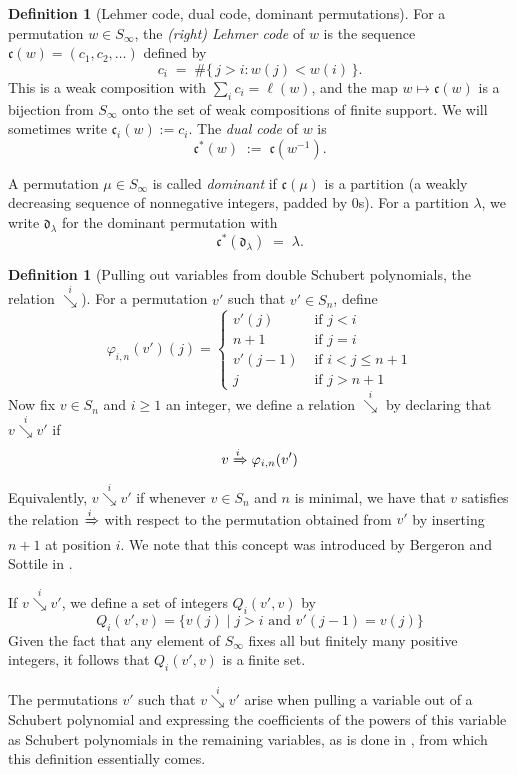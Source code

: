 \documentclass{amsart}
\theoremstyle{definition}
\newtheorem{definition}[lemma]{Definition}
\theoremstyle{remark}
\numberwithin{equation}{subsection}
\newcommand{\downvar}[1]{\stackrel{#1}{\searrow}}
\newcommand{\Tom}[1]{\xRightarrow{#1}}
\newcommand{\dom}{\mathfrak{d}}
\newcommand{\code}{\mathfrak{c}}
\begin{document}
\begin{definition}[Lehmer code, dual code, dominant permutations]\label{definition:codestuff}
For a permutation $w\in S_\infty$, the \emph{(right) Lehmer code} of $w$ is the sequence $\code(w)=(c_1,c_2,\ldots)$ defined by
$$c_i \;=\; \#\{\,j>i : w(j)<w(i)\,\}.$$
This is a weak composition with $\sum_i c_i=\ell(w)$, and the map $w\mapsto\code(w)$ is a bijection from $S_\infty$ onto the set of weak compositions of finite support. We will sometimes write $\code_i(w):=c_i$. The \emph{dual code} of $w$ is
$$\code^*(w) \;:=\; \code(w^{-1}).$$

A permutation $\mu\in S_\infty$ is called \emph{dominant} if $\code(\mu)$ is a partition (a weakly decreasing sequence of nonnegative integers, padded by $0$s). For a partition $\lambda$, we write $\dom_\lambda$ for the dominant permutation with
$$\code^*(\dom_\lambda) \;=\; \lambda.$$
\end{definition}

\begin{definition}[Pulling out variables from double Schubert polynomials, the relation $\downvar{i}$] \label{definition:polysequence}
		For a permutation $v'$ such that $v'\in S_{n}$, define
		$$\varphi_{i,n}(v')(j)=\begin{cases}
			v'(j)&\mbox{ if }j<i\\
			n+1&\mbox{ if }j=i\\
			v'(j-1)&\mbox{ if }i<j\leq n+1\\
			j&\mbox{ if }j>n+1
		\end{cases}$$
		Now fix $v\in S_n$ and $i\geq 1$ an integer, we define a relation $\downvar{i}$ by declaring that $v\downvar{i} v'$ if 
		$$v\Tom{i}\varphi_{i,n}(v')$$
		Equivalently, $v\downvar{i} v'$ if whenever $v\in S_n$ and $n$ is minimal, we have that $v$ satisfies the relation $\Tom{i}$ with respect to the permutation obtained from $v'$ by inserting $n+1$ at position $i$. We note that this concept was introduced by Bergeron and Sottile in \cite{bsskew}.
		
		If $v\downvar{i} v'$, we define a set of integers $Q_i(v',v)$ by
		$$Q_i(v',v)=\{v(j)\mid j>i\mbox{ and }v'(j-1)=v(j)\}$$
		Given the fact that any element of $S_\infty$ fixes all but finitely many positive integers, it follows that $Q_i(v',v)$ is a finite set.
		
		The permutations $v'$ such that $v\downvar{i} v'$ arise when pulling a variable out of a Schubert polynomial and expressing the coefficients of the powers of this variable as Schubert polynomials in the remaining variables, as is done in \cite{coprod}, from which this definition essentially comes.

  \end{definition}
  
\end{document}
